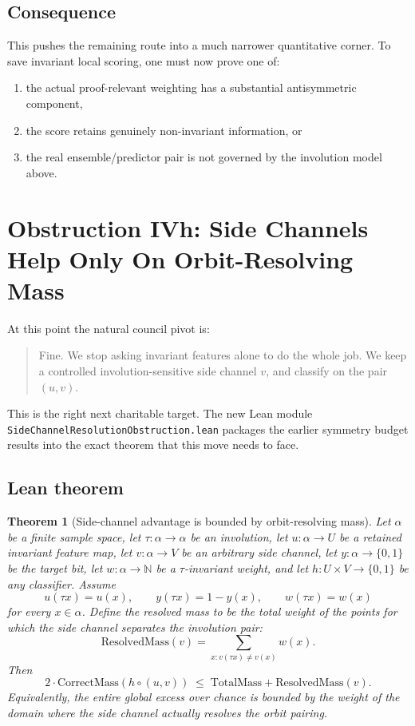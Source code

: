 \documentclass[11pt]{article}
\newtheorem{theorem}{Theorem}[section]
\theoremstyle{remark}
\begin{document}
\subsection{Consequence}

This pushes the remaining route into a much narrower quantitative corner.  To save invariant local
scoring, one must now prove one of:
\begin{enumerate}[leftmargin=1.5em]
  \item the actual proof-relevant weighting has a substantial antisymmetric component,
  \item the score retains genuinely non-invariant information, or
  \item the real ensemble/predictor pair is not governed by the involution model above.
\end{enumerate}

\section{Obstruction IVh: Side Channels Help Only On Orbit-Resolving Mass}

At this point the natural council pivot is:
\begin{quote}
Fine.  We stop asking invariant features alone to do the whole job.  We keep a controlled
involution-sensitive side channel \(v\), and classify on the pair \((u,v)\).
\end{quote}

This is the right next charitable target.  The new Lean module
\texttt{SideChannelResolutionObstruction.lean} packages the earlier symmetry budget results into the
exact theorem that this move needs to face.

\subsection{Lean theorem}

\begin{theorem}[Side-channel advantage is bounded by orbit-resolving mass]
Let \(\alpha\) be a finite sample space, let \(\tau : \alpha \to \alpha\) be an involution, let
\(u : \alpha \to U\) be a retained invariant feature map, let \(v : \alpha \to V\) be an arbitrary
side channel, let \(y : \alpha \to \{0,1\}\) be the target bit, let \(w : \alpha \to \mathbb{N}\)
be a \(\tau\)-invariant weight, and let \(h : U \times V \to \{0,1\}\) be any classifier.  Assume
\[
  u(\tau x) = u(x), \qquad y(\tau x) = 1-y(x), \qquad w(\tau x) = w(x)
\]
for every \(x \in \alpha\).  Define the \emph{resolved mass} to be the total weight of the points
for which the side channel separates the involution pair:
\[
  \mathrm{ResolvedMass}(v)
  =
  \sum_{x : v(\tau x) \neq v(x)} w(x).
\]
Then
\[
  2 \cdot \mathrm{CorrectMass}(h \circ (u,v))
  \;\le\;
  \mathrm{TotalMass} + \mathrm{ResolvedMass}(v).
\]
Equivalently, the entire global excess over chance is bounded by the weight of the domain where the
side channel actually resolves the orbit pairing.
\end{theorem}
\end{document}

